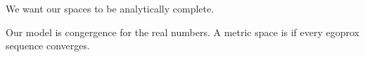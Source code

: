 

We want our spaces to be
analytically complete.


Our model is congergence for
the real numbers.
A metric space is 
if every egoprox sequence converges.

